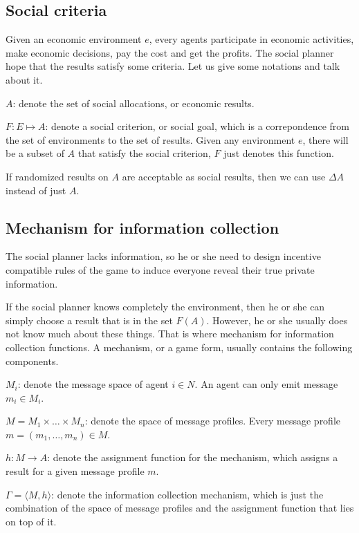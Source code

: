 \subsection{Social criteria}

Given an economic environment $e$, every agents participate in economic activities, make economic decisions, pay the cost and get the profits. The social planner hope that the results satisfy some criteria.
Let us give some notations and talk about it.

$A$: denote the set of social allocations, or economic results.

$F : E \mapsto A$: denote a social criterion, or social goal, which is a correpondence from the set of environments to the set of results. Given any environment $e$, there will be a subset of $A$ that satisfy the social criterion, $F$ just denotes this function.

If randomized results on $A$ are acceptable as social results, then we can use 
$\Delta A$ instead of just $A$. 

\subsection{Mechanism for information collection}

 The social planner lacks information, so he or she need to design incentive
compatible rules of the game to induce everyone reveal their true private information. 

If the social planner knows completely the environment, then he or she
can simply choose a result that is in the set $F(A)$. However, he or
she usually does not know much about these things. That is where
mechanism for information collection functions.  A mechanism, or  a
game form, usually contains the following components.

$M_i$: denote the message space of agent $i \in N$. An agent can only emit 
message $m_i \in M_i$.

$M=M_1\times\dots\times M_n$: denote the space of message profiles. Every message profile $m=(m_1,\dots,m_n)\in M$.

$h:M\rightarrow A$: denote the assignment function for the mechanism, which assigns a result for a given message profile $m$.

$ \Gamma = \langle M,h\rangle$: denote the information collection mechanism, which is just the combination of the space of message profiles and the assignment function that lies on top of it.

